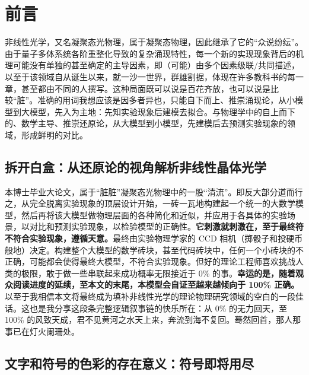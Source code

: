 

\chapter{前言}\label{chap:tttttt}

非线性光学，又名凝聚态光物理，属于凝聚态物理，因此继承了它的“众说纷纭”。由于量子多体系统各阶重整化导致的复杂涌现特性，每一个新的实现现象背后的机理可能没有单独的甚至确定的主导因素，即（可能）由多个因素级联/共同描述，以至于该领域自从诞生以来，就一沙一世界，群雄割据，体现在许多教科书的每一章，甚至都由不同的人撰写。这种局面既可以说是百花齐放，也可以说是比较“脏”。准确的用词我想应该是因多者异也，只能自下而上、推崇涌现论，从小模型到大模型，先入为主地：先知实验现象后建模去拟合。与物理学中的自上而下的、数学主导、推崇还原论，从大模型到小模型，先建模后去预测实验现象的领域，形成鲜明的对比。

\section{拆开白盒：从还原论的视角解析非线性晶体光学}\label{sec:ttt}

本博士毕业大论文，属于“脏脏”凝聚态光物理中的一股“清流”。即反大部分道而行之，从完全脱离实验现象的顶层设计开始，一砖一瓦地构建起一个统一的大数学模型，然后再将该大模型做物理层面的各种简化和近似，并应用于各具体的实验场景，以对比和预测实验现象，以检验模型的正确性。\textbf{它刺激就刺激在，至于最终符不符合实验现象，遵循天意。}最终由实验物理学家的 CCD 相机（掷骰子和投硬币般地）决定。构建整个大模型的数学砖块，甚至代码砖块中，任何一个小砖块的不正确，可能都会使得最终大模型，不符合实验现象。但好的理论工程师喜欢挑战人类的极限，敢于做一些串联起来成功概率无限接近于 0\% 的事。\textbf{幸运的是，随着观众阅读进度的延续，至本文的末尾，本模型会自证至越来越倾向于 100\% 正确。}以至于我相信本文将最终成为填补非线性光学的理论物理研究领域的空白的一段佳话。这也是我分享这段条完整逻辑叙事链的快乐所在：从 0\% 的无力回天，至 100\% 的风致天成，君不见黄河之水天上来，奔流到海不复回。蓦然回首，那人那事已在灯火阑珊处。

\section{文字和符号的色彩的存在意义：符号即将用尽}\label{sec:tt}

